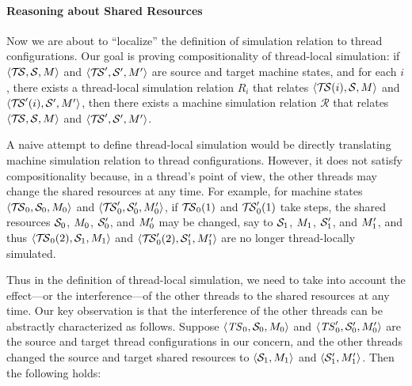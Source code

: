 \paragraph{Reasoning about Shared Resources}

Now we are about to ``localize'' the definition of simulation relation to thread configurations.
Our goal is proving compositionality of thread-local simulation: if ${\langle{\mathcal{T\!S},{\cal S},M}\rangle}$ and
${\langle{\mathcal{T\!S}',{\cal S}',M'}\rangle}$ are source and target machine states, and for each $i$, there exists a
thread-local simulation relation $R_i$ that relates ${\langle{\mathcal{T\!S}(i),{\cal S},M}\rangle}$ and
${\langle{\mathcal{T\!S}'(i),{\cal S}',M'}\rangle}$, then there exists a machine simulation relation $\mathcal{R}$ that
relates ${\langle{\mathcal{T\!S},{\cal S},M}\rangle}$ and ${\langle{\mathcal{T\!S}',{\cal S}',M'}\rangle}$.

A naive attempt to define thread-local simulation would be directly translating machine simulation
relation to thread configurations.  However, it does not satisfy compositionality because, in a
thread's point of view, the other threads may change the shared resources at any time.  For example,
for machine states ${\langle{\mathcal{T\!S}_0,{\cal S}_0,M_0}\rangle}$ and ${\langle{\mathcal{T\!S}'_0,{\cal S}'_0,M'_0}\rangle}$, if
$\mathcal{T\!S}_0(1)$ and $\mathcal{T\!S}'_0(1)$ take steps, the shared resources ${\cal S}_0$, $M_0$, ${\cal S}'_0$, and
$M'_0$ may be changed, say to ${\cal S}_1$, $M_1$, ${\cal S}'_1$, and $M'_1$, and thus
${\langle{\mathcal{T\!S}_0(2),{\cal S}_1,M_1}\rangle}$ and ${\langle{\mathcal{T\!S}'_0(2),{\cal S}'_1,M'_1}\rangle}$ are no longer
thread-locally simulated.

Thus in the definition of thread-local simulation, we need to take into account the effect---or the
interference---of the other threads to the shared resources at any time.  Our key observation is
that the interference of the other threads can be abstractly characterized as follows.  Suppose
${\langle{\mathit{TS}_0,{\cal S}_0,M_0}\rangle}$ and ${\langle{\mathit{TS}'_0,{\cal S}'_0,M'_0}\rangle}$ are the source and target thread
configurations in our concern, and the other threads changed the source and target shared resources
to ${\langle{{\cal S}_1,M_1}\rangle}$ and ${\langle{{\cal S}'_1,M'_1}\rangle}$.  Then the following holds:

